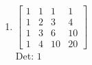\documentclass[12pt]{article}
\begin{document}
\begin{enumerate}
\begin{enumerate}
\begin{enumerate}


\item $\displaystyle \left[\begin{matrix}1 & 1 & 1 & 1\\1 & 2 & 3 & 4\\1 & 3 & 6 & 10\\1 & 4 & 10 & 20\end{matrix}\right]$\\

Det: $1$\\

\end{enumerate}

\end{enumerate}


\end{enumerate}
\end{document}
